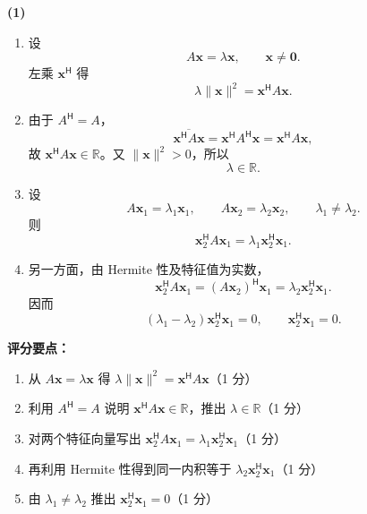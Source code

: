 \documentclass[10pt,a4paper]{exam-zh}
\newcommand{\bvec}[1]{\boldsymbol{#1}}
\newcommand{\ct}{\mathsf{H}}
\newcommand{\R}{\mathbb{R}}
\newenvironment{grading}
  {\par\smallskip\Needspace{5\baselineskip}\small
   \noindent\textcolor{gradingred}{\textbf{评分要点：}}
   \begin{enumerate}[label=\textcolor{gradingred}{\arabic*.},
     leftmargin=2.4em,itemsep=0pt,topsep=2pt,parsep=0pt]}
  {\end{enumerate}\smallskip}
\newcommand{\gradeitem}[2]{\item #1（\textcolor{gradingred}{#2 分}）}
\newenvironment{answersteps}
  {\begin{enumerate}[label=\textbf{步骤 \arabic*.},
    leftmargin=4.8em,labelsep=0.6em,itemsep=2pt,topsep=3pt,parsep=0pt]}
  {\end{enumerate}}
\newcommand{\subanswer}[1]{%
  \par\medskip\Needspace{6\baselineskip}\noindent\textbf{#1}\par}
\begin{document}
\begin{solution}
\subanswer{(1)}
\begin{answersteps}
  \item 设
  \[
  A\bvec x=\lambda\bvec x,
  \qquad
  \bvec x\ne\bvec0.
  \]
  左乘 $\bvec x^\ct$ 得
  \[
  \lambda\|\bvec x\|^2=\bvec x^\ct A\bvec x.
  \]
  \item 由于 $A^\ct=A$，
  \[
  \overline{\bvec x^\ct A\bvec x}
  =\bvec x^\ct A^\ct\bvec x
  =\bvec x^\ct A\bvec x,
  \]
  故 $\bvec x^\ct A\bvec x\in\R$。又 $\|\bvec x\|^2>0$，所以
  \[
  \boxed{\lambda\in\R}.
  \]
  \item 设
  \[
  A\bvec x_1=\lambda_1\bvec x_1,
  \qquad
  A\bvec x_2=\lambda_2\bvec x_2,
  \qquad
  \lambda_1\ne\lambda_2.
  \]
  则
  \[
  \bvec x_2^\ct A\bvec x_1
  =\lambda_1\bvec x_2^\ct\bvec x_1.
  \]
  \item 另一方面，由 Hermite 性及特征值为实数，
  \[
  \bvec x_2^\ct A\bvec x_1
  =(A\bvec x_2)^\ct\bvec x_1
  =\lambda_2\bvec x_2^\ct\bvec x_1.
  \]
  因而
  \[
  (\lambda_1-\lambda_2)\bvec x_2^\ct\bvec x_1=0,
  \qquad
  \boxed{\bvec x_2^\ct\bvec x_1=0}.
  \]
\end{answersteps}
\begin{grading}
  \gradeitem{从 $A\bvec x=\lambda\bvec x$ 得
  $\lambda\|\bvec x\|^2=\bvec x^\ct A\bvec x$}{1}
  \gradeitem{利用 $A^\ct=A$ 说明 $\bvec x^\ct A\bvec x\in\R$，推出 $\lambda\in\R$}{1}
  \gradeitem{对两个特征向量写出
  $\bvec x_2^\ct A\bvec x_1=\lambda_1\bvec x_2^\ct\bvec x_1$}{1}
  \gradeitem{再利用 Hermite 性得到同一内积等于
  $\lambda_2\bvec x_2^\ct\bvec x_1$}{1}
  \gradeitem{由 $\lambda_1\ne\lambda_2$ 推出
  $\bvec x_2^\ct\bvec x_1=0$}{1}
\end{grading}


\end{solution}
\end{document}
